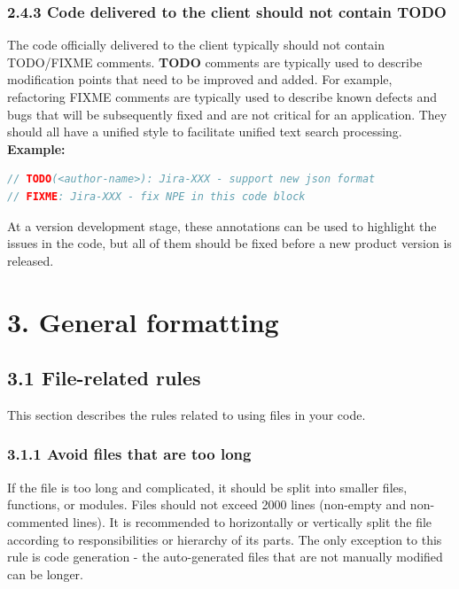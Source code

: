 \subsubsection*{\textbf{2.4.3 Code delivered to the client should not contain TODO}}
\leavevmode\newline
\label{sec:2.4.3}
The code officially delivered to the client typically should not contain TODO/FIXME comments.
\textbf{TODO} comments are typically used to describe modification points that need to be improved and added. For example, refactoring FIXME comments are typically used to describe known defects and bugs that will be subsequently fixed and are not critical for an application.
They should all have a unified style to facilitate unified text search processing.
\textbf{Example:}
\begin{lstlisting}[language=Kotlin]
// TODO(<author-name>): Jira-XXX - support new json format
// FIXME: Jira-XXX - fix NPE in this code block
\end{lstlisting}
At a version development stage, these annotations can be used to highlight the issues in the code, but all of them should be fixed before a new product version is released.
\section*{\textbf{3. General formatting}}
\label{sec:3.}
\subsection*{\textbf{3.1 File-related rules}}
\label{sec:3.1}
This section describes the rules related to using files in your code.
\subsubsection*{\textbf{3.1.1 Avoid files that are too long}}
\leavevmode\newline
\label{sec:3.1.1}
If the file is too long and complicated, it should be split into smaller files, functions, or modules. Files should not exceed 2000 lines (non-empty and non-commented lines).
It is recommended to horizontally or vertically split the file according to responsibilities or hierarchy of its parts.
The only exception to this rule is code generation - the auto-generated files that are not manually modified can be longer.
